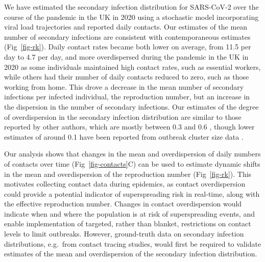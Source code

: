 \documentclass[
  10pt,
  letterpaper,
]{article}
\begin{document}
We have estimated the secondary infection distribution for SARS-CoV-2
over the course of the pandemic in the UK in 2020 using a stochastic
model incorporating viral load trajectories and reported daily contacts.
Our estimates of the mean number of secondary infections are consistent
with contemporaneous estimates (Fig~\ref{fig-rk}). Daily contact rates
became both lower on average, from 11.5 per day to 4.7 per day, and more
overdispersed during the pandemic in the UK in 2020 as some individuals
maintained high contact rates, such as essential workers, while others
had their number of daily contacts reduced to zero, such as those
working from home. This drove a decrease in the mean number of secondary
infections per infected individual, the reproduction number, but an
increase in the dispersion in the number of secondary infections. Our
estimates of the degree of overdispersion in the secondary infection
distribution are similar to those reported by other authors, which are
mostly between 0.3 and 0.6 \citep{lau2020, kremer2021}, though lower
estimates of around 0.1 have been reported from outbreak cluster size
data \citep{endo2020}.

Our analysis shows that changes in the mean and overdispersion of daily
numbers of contacts over time (Fig~\ref{fig-contacts}C) can be used to
estimate dynamic shifts in the mean and overdispersion of the
reproduction number (Fig~\ref{fig-rk}). This motivates collecting
contact data during epidemics, as contact overdispersion could provide a
potential indicator of superspreading risk in real-time, along with the
effective reproduction number. Changes in contact overdispersion would
indicate when and where the population is at risk of superspreading
events, and enable implementation of targeted, rather than blanket,
restrictions on contact levels to limit outbreaks. However, ground-truth
data on secondary infection distributions, e.g.~from contact tracing
studies, would first be required to validate estimates of the mean and
overdispersion of the secondary infection distribution.
\end{document}
